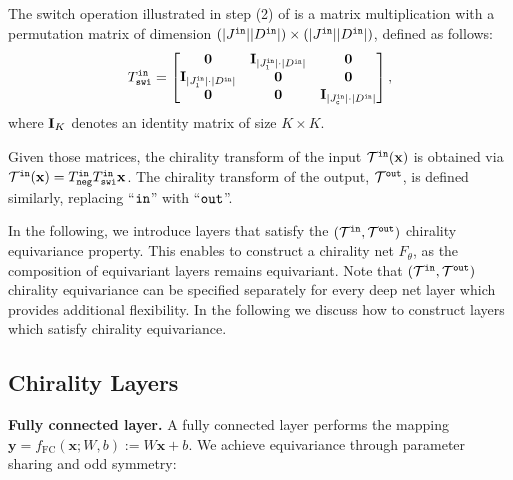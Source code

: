 \documentclass{article}
\def\rvx{{\mathbf{x}}}
\def\rvy{{\mathbf{y}}}
\begin{document}
The switch operation illustrated in step (2) of  is a matrix multiplication with a permutation matrix of dimension $(|{J}^{\tt in}||D^{\tt in}|) \times (|{J}^{\tt in}||D^{\tt in}|)$, defined as follows:
$$T^{\tt in}_{\tt swi}  = \begin{bmatrix} 
\bf 0 & \mathbf{I}_{|{J}^{\tt in}_{\tt l}|\cdot |D^{\tt in}|} & \bf 0 \\
\mathbf{I}_{|{J}^{\tt in}_{\tt l}|\cdot |D^{\tt in}|}  & \bf 0 & \bf 0\\
\bf 0 & \bf 0 & \mathbf{I}_{|{J}^{\tt in}_{\tt c}|\cdot |D^{\tt in}|} 
\end{bmatrix},$$
where ${\bf I}_{K}$ denotes an identity matrix of size $K \times K$. 

Given those matrices, the chirality transform of the input $\mathcal{T^{\tt in}}(\rvx)$ is obtained via $\mathcal{T^{\tt in}}(\rvx) = T^{\tt in}_{\tt neg} T^{\tt in}_{\tt swi} \rvx$. The chirality transform of the output, $\mathcal{T^{\tt out}}$, is defined similarly, replacing ``${\tt in}$'' with ``${\tt out}$''.

In the following, we  introduce layers that satisfy the $(\mathcal{T^{\tt in}, T^{\tt out}})$ chirality equivariance property. This enables to construct a chirality net $F_\theta$, as the composition of equivariant layers remains equivariant.  Note that $(\mathcal{T^{\tt in}, T^{\tt out}})$ chirality equivariance can be specified separately for every deep net layer which provides additional flexibility. 
In the following we discuss how to construct  layers which satisfy chirality equivariance. 

\subsection{Chirality Layers}

\textbf{Fully connected layer.} 
A fully connected layer performs the mapping $\rvy = f_{\text{FC}}(\rvx ; W, b) := W\rvx + b$. 
We achieve equivariance through parameter sharing and odd symmetry:
\end{document}
